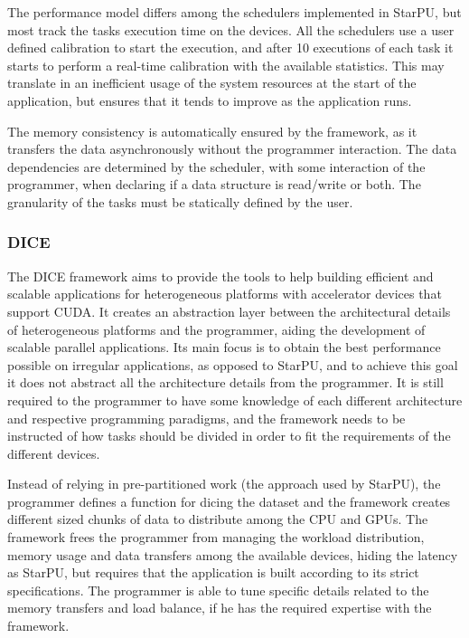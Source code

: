 The performance model differs among the schedulers implemented in StarPU, but most track the tasks execution time on the devices. All the schedulers use a user defined calibration to start the execution, and after 10 executions of each task it starts to perform a real-time calibration with the available statistics. This may translate in an inefficient usage of the system resources at the start of the application, but ensures that it tends to improve as the application runs.

The memory consistency is automatically ensured by the framework, as it transfers the data asynchronously without the programmer interaction. The data dependencies are determined by the scheduler, with some interaction of the programmer, when declaring if a data structure is read/write or both. The granularity of the tasks must be statically defined by the user.

\subsubsection*{DICE}

The DICE framework aims to provide the tools to help building efficient and scalable applications for heterogeneous platforms with accelerator devices that support CUDA. It creates an abstraction layer between the architectural details of heterogeneous platforms and the programmer, aiding the development of scalable parallel applications. Its main focus is to obtain the best performance possible on irregular applications, as opposed to StarPU, and to achieve this goal it does not abstract all the architecture details from the programmer. It is still required to the programmer to have some knowledge of each different architecture and respective programming paradigms, and the framework needs to be instructed of how tasks should be divided in order to fit the requirements of the different devices. 

Instead of relying in pre-partitioned work (the approach used by StarPU), the programmer defines a function for dicing the dataset and the framework creates different sized chunks of data to distribute among the CPU and GPUs. The framework frees the programmer from managing the workload distribution, memory usage and data transfers among the available devices, hiding the latency as StarPU, but requires that the application is built according to its strict specifications. The programmer is able to tune specific details related to the memory transfers and load balance, if he has the required expertise with the framework.


